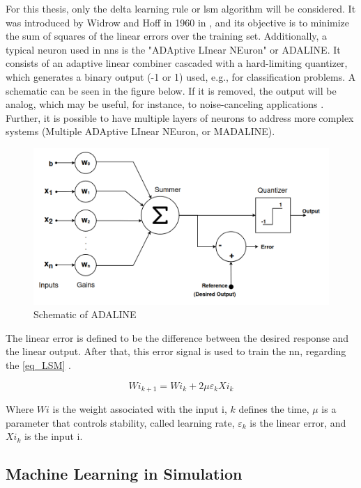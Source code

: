 For this thesis, only the delta learning rule or \gls{lsm} algorithm will be considered. It was introduced by Widrow and Hoff in 1960 in \cite{widrow1960adaptive}, and its objective is to minimize the sum of squares of the linear errors over the training set. Additionally, a typical neuron used in \glspl{nn} is the "ADAptive LInear NEuron" or ADALINE. It consists of an adaptive linear combiner cascaded with a hard-limiting quantizer, which generates a binary output (-1 or 1) used, e.g., for classification problems. A schematic can be seen in the figure below. If it is removed, the output will be analog, which may be useful, for instance, to noise-canceling applications \cite{widrow1985adaptive}. Further, it is possible to have multiple layers of neurons to address more complex systems (Multiple ADAptive LInear NEuron, or MADALINE).

\begin{figure}[H]
	\centering
 	\includegraphics[width=0.8\linewidth]{Images/AdalineSquematic.png}
 	\caption{Schematic of ADALINE \cite{widrow1960adaptive}}
	 \label{fig_AdalineSquematic}
\end{figure}

The linear error is defined to be the difference between the desired response and the linear output. After that, this error signal is used to train the \gls{nn}, regarding the \autoref{eq_LSM} \cite{widrow1995perceptrons}.

\begin{equation}
    Wi_{k+1} = Wi_{k} + 2 \mu \varepsilon_{k}Xi_{k}
    \label{eq_LSM}
\end{equation}

Where $Wi$ is the weight associated with the input i, $k$ defines the time, $\mu$ is a parameter that controls stability, called learning rate, $\varepsilon_{k}$ is the linear error, and $Xi_{k}$ is the input i. 

\subsection{Machine Learning in Simulation}

